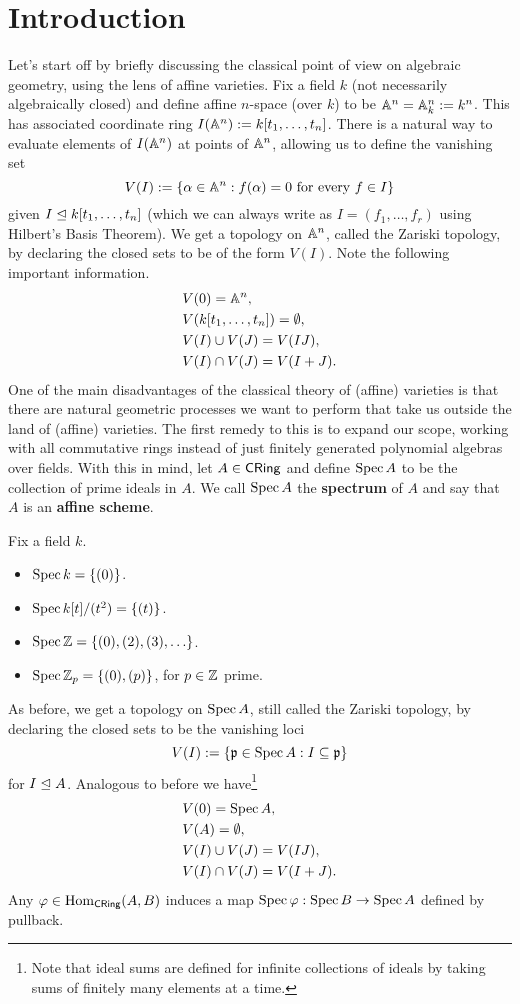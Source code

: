 \documentclass[11pt]{article}
\renewcommand{\phi}{\varphi}
\begin{document}
\section{Introduction}
Let's start off by briefly discussing the classical point of view on algebraic geometry, using the lens of affine varieties. Fix a field $k$ (not necessarily algebraically closed) and define affine $n$-space (over $k$) to be $\mathbb{A}^n=\mathbb{A}_k^n:=k^n$. This has associated coordinate ring $I(\mathbb{A}^n):=k[t_1,\ldots,t_n]$. There is a natural way to evaluate elements of $I(\mathbb{A}^n)$ at points of $\mathbb{A}^n$, allowing us to define the vanishing set
$$V(I):=\{\alpha\in\mathbb{A}^n : f(\alpha)=0\textrm{ for every }f\in I\}$$
given $I\trianglelefteq k[t_1,\ldots,t_n]$ (which we can always write as $I=(f_1,\ldots,f_r)$ using Hilbert's Basis Theorem). We get a topology on $\mathbb{A}^n$, called the Zariski topology, by declaring the closed sets to be of the form $V(I)$. Note the following important information.
\begin{align*}
&V(0)=\mathbb{A}^n, \\
&V(k[t_1,\ldots,t_n])=\emptyset, \\
&V(I)\cup V(J)=V(IJ), \\
&V(I)\cap V(J)=V(I+J).
\end{align*}
One of the main disadvantages of the classical theory of (affine) varieties is that there are natural geometric processes we want to perform that take us outside the land of (affine) varieties. The first remedy to this is to expand our scope, working with all commutative rings instead of just finitely generated polynomial algebras over fields. With this in mind, let $A\in\operatorname{\mathsf{CRing}}$ and define $\operatorname{Spec} A$ to be the collection of prime ideals in $A$. We call $\operatorname{Spec} A$ the \textbf{spectrum} of $A$ and say that $A$ is an \textbf{affine scheme}.

\begin{example}
Fix a field $k$.
\begin{itemize}
\item $\operatorname{Spec} k=\{(0)\}$.

\item $\operatorname{Spec} k[t]/(t^2)=\{(t)\}$.

\item $\operatorname{Spec}\mathbb{Z}=\{(0),(2),(3),\ldots\}$.

\item $\operatorname{Spec}\mathbb{Z}_p=\{(0),(p)\}$, for $p\in\mathbb{Z}$ prime.
\end{itemize}
\end{example}

As before, we get a topology on $\operatorname{Spec} A$, still called the Zariski topology, by declaring the closed sets to be the vanishing loci
$$V(I):=\{\mathfrak{p}\in\operatorname{Spec} A : I\subseteq\mathfrak{p}\}$$
for $I\trianglelefteq A$. Analogous to before we have\footnote{Note that ideal sums are defined for infinite collections of ideals by taking sums of finitely many elements at a time.}
\begin{align*}
&V(0)=\operatorname{Spec} A, \\
&V(A)=\emptyset, \\
&V(I)\cup V(J)=V(IJ), \\
&V(I)\cap V(J)=V(I+J).
\end{align*}
Any $\phi\in\Hom_{\CRing}(A,B)$ induces a map $\Spec\phi: \Spec B\to\Spec A$ defined by pullback.
\end{document}
